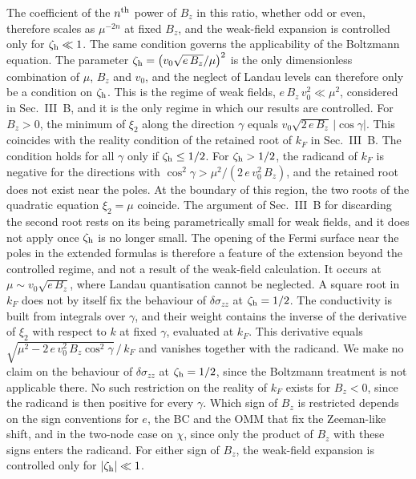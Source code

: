 \documentclass[aps,prb,onecolumn,nofootinbib,citeautoscript,10pt]{revtex4-2}
\begin{document}
\begin{enumerate}
The coefficient of the $n^{\rm th}$ power of $B_z$ in this ratio, whether odd or even, therefore scales as $\mu^{-2n}$ at fixed $B_z$, and the weak-field expansion is controlled only for $\zeta_{\rm h}\ll1$. The same condition governs the applicability of the Boltzmann equation. The parameter $\zeta_{\rm h}=\left(v_0\sqrt{e\,B_z}/\mu\right)^2$ is the only dimensionless combination of $\mu$, $B_z$ and $v_0$, and the neglect of Landau levels can therefore only be a condition on $\zeta_{\rm h}$. This is the regime of weak fields, $e\,B_z\,v_0^2\ll\mu^2$, considered in Sec.~III~B, and it is the only regime in which our results are controlled. For $B_z>0$, the minimum of $\xi_2$ along the direction $\gamma$ equals $v_0\sqrt{2\,e\,B_z}\,|\cos\gamma|$. This coincides with the reality condition of the retained root of $k_F$ in Sec.~III~B. The condition holds for all $\gamma$ only if $\zeta_{\rm h}\le1/2$. For $\zeta_{\rm h}>1/2$, the radicand of $k_F$ is negative for the directions with $\cos^2\gamma>\mu^2/(2\,e\,v_0^2\,B_z)$, and the retained root does not exist near the poles. At the boundary of this region, the two roots of the quadratic equation $\xi_2=\mu$ coincide. The argument of Sec.~III~B for discarding the second root rests on its being parametrically small for weak fields, and it does not apply once $\zeta_{\rm h}$ is no longer small. The opening of the Fermi surface near the poles in the extended formulas is therefore a feature of the extension beyond the controlled regime, and not a result of the weak-field calculation. It occurs at $\mu\sim v_0\sqrt{e\,B_z}$, where Landau quantisation cannot be neglected. A square root in $k_F$ does not by itself fix the behaviour of $\delta\sigma_{zz}$ at $\zeta_{\rm h}=1/2$. The conductivity is built from integrals over $\gamma$, and their weight contains the inverse of the derivative of $\xi_2$ with respect to $k$ at fixed $\gamma$, evaluated at $k_F$. This derivative equals $\sqrt{\mu^2-2\,e\,v_0^2\,B_z\cos^2\gamma}\,/\,k_F$ and vanishes together with the radicand. We make no claim on the behaviour of $\delta\sigma_{zz}$ at $\zeta_{\rm h}=1/2$, since the Boltzmann treatment is not applicable there. No such restriction on the reality of $k_F$ exists for $B_z<0$, since the radicand is then positive for every $\gamma$. Which sign of $B_z$ is restricted depends on the sign conventions for $e$, the BC and the OMM that fix the Zeeman-like shift, and in the two-node case on $\chi$, since only the product of $B_z$ with these signs enters the radicand. For either sign of $B_z$, the weak-field expansion is controlled only for $|\zeta_{\rm h}|\ll1$.


\end{enumerate}
\end{document}
